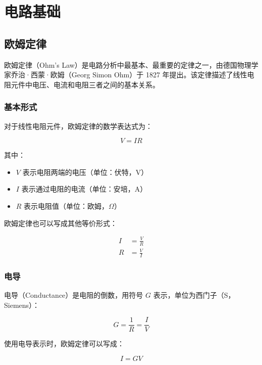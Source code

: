 \chapter{电路基础}

\section{欧姆定律}

欧姆定律（Ohm's Law）是电路分析中最基本、最重要的定律之一，由德国物理学家乔治·西蒙·欧姆（Georg Simon Ohm）于 1827 年提出。该定律描述了线性电阻元件中电压、电流和电阻三者之间的基本关系。

\subsection{基本形式}

对于线性电阻元件，欧姆定律的数学表达式为：

\begin{equation}
V = IR \label{eq:ohm-law}
\end{equation}

其中：
\begin{itemize}
  \item $V$ 表示电阻两端的电压（单位：伏特，V）
  \item $I$ 表示通过电阻的电流（单位：安培，A）
  \item $R$ 表示电阻值（单位：欧姆，$\Omega$）
\end{itemize}

欧姆定律也可以写成其他等价形式：

\begin{align}
I &= \frac{V}{R} \label{eq:ohm-law-current} \\
R &= \frac{V}{I} \label{eq:ohm-law-resistance}
\end{align}

\subsection{电导}

电导（Conductance）是电阻的倒数，用符号 $G$ 表示，单位为西门子（S，Siemens）：

\begin{equation}
G = \frac{1}{R} = \frac{I}{V} \label{eq:conductance}
\end{equation}

使用电导表示时，欧姆定律可以写成：

\begin{equation}
I = GV \label{eq:ohm-law-conductance}
\end{equation}

